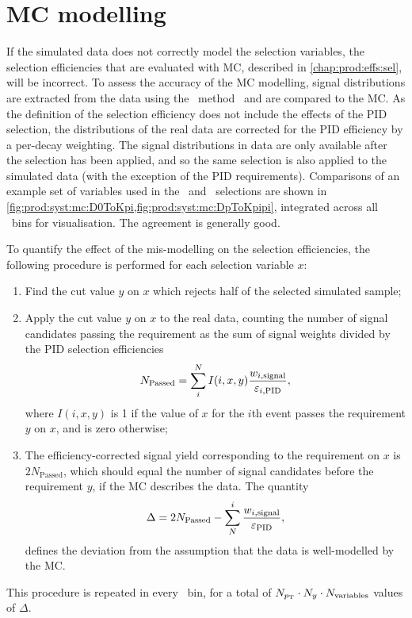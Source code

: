 \section{\acl{MC} modelling}
\label{chap:prod:syst:mc}

If the simulated data does not correctly model the selection variables, the 
selection efficiencies that are evaluated with \ac{MC}, described in 
\cref{chap:prod:effs:sel}, will be incorrect.
To assess the accuracy of the \acl{MC} modelling, signal distributions are 
extracted from the data using the \sPlot\ method~\cite{Pivk:2004ty} and are 
compared to the \ac{MC}.
As the definition of the selection efficiency does not include the effects of 
the \ac{PID} selection, the distributions of the real data are corrected for 
the \ac{PID} efficiency by a per-decay weighting.
The signal distributions in data are only available after the selection has 
been applied, and so the same selection is also applied to the simulated data 
(with the exception of the \ac{PID} requirements).
Comparisons of an example set of variables used in the \DzToKpi\ and 
\DpToKpipi\ selections are shown in 
\cref{fig:prod:syst:mc:D0ToKpi,fig:prod:syst:mc:DpToKpipi}, integrated across 
all \pTy\ bins for visualisation.
The agreement is generally good.

To quantify the effect of the mis-modelling on the selection efficiencies, the 
following procedure is performed for each selection variable $x$:
\begin{enumerate}
  \item Find the cut value $y$ on $x$ which rejects half of the selected 
    simulated sample;
  \item Apply the cut value $y$ on $x$ to the real data, counting the number of 
    signal candidates passing the requirement as the sum of signal weights 
    divided by the \ac{PID} selection efficiencies
    \begin{equation}
      N_{\text{Passed}} = \sum_{i}^{N} I(i, x, y) \frac{%
        w_{i,\text{signal}}
      }{%
        \eff_{i,\text{PID}}
      },
    \end{equation}
    where $I(i, x, y)$ is 1 if the value of $x$ for the $i$th event passes the 
    requirement $y$ on $x$, and is zero otherwise;
  \item The efficiency-corrected signal yield corresponding to the requirement 
    on $x$ is $2N_{\text{Passed}}$, which should equal the number of signal 
    candidates before the requirement $y$, if the \ac{MC} describes the data.  
    The quantity
    \begin{equation}
      \Delta = 2N_{\text{Passed}} - \sum_{N}^{i} \frac{w_{i,\text{signal}}}{\varepsilon_{\textnormal{PID}}},
      \label{eqn:prod:syst:mc:eff_diff}
    \end{equation}
    defines the deviation from the assumption that the data is well-modelled by 
    the \ac{MC}.
\end{enumerate}
This procedure is repeated in every \pTy\ bin, for a total of $N_{p_{\textnormal{T}}} \cdot 
N_{y} \cdot N_{\text{variables}}$ values of $\Delta$.

